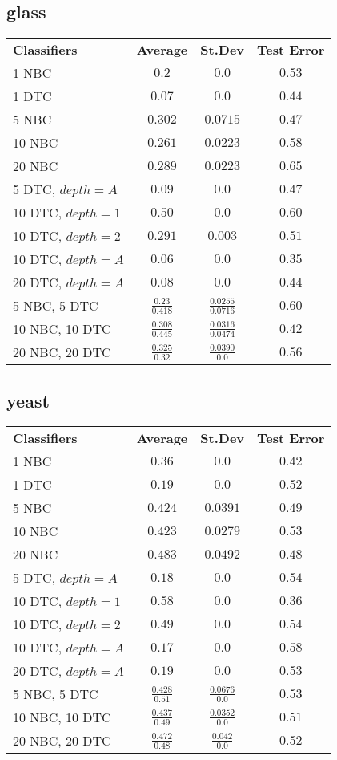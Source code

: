 \documentclass[12pt]{article}
\begin{document}
	\subsection{glass}
		\begin{tabular}{lccc}
		\textbf{Classifiers} & \textbf{Average} & \textbf{St.Dev} & \textbf{Test Error}\\
			1 NBC & $0.2$ & $0.0$ & $0.53$\\
			1 DTC & $0.07$ & $0.0$ & $0.44$\\
			5 NBC & $0.302$ & $0.0715$ & $0.47$\\
			10 NBC & $0.261$ & $0.0223$ & $0.58$\\
			20 NBC & $0.289$ & $0.0223$ & $0.65$\\
			5 DTC, $depth = A$ & $0.09$ & $0.0$ & $0.47$ \\
			10 DTC, $depth = 1$ & $0.50$ & $0.0$ & $0.60$ \\
			10 DTC, $depth = 2$ & $0.291$ & $0.003$ & $0.51$ \\
			10 DTC, $depth = A$ & $0.06$ & $0.0$ & $0.35$ \\
			20 DTC, $depth = A$ & $0.08$ & $0.0$ & $0.44$ \\
			5 NBC, 5 DTC & $\frac{0.23}{0.418}$ & $\frac{0.0255}{0.0716}$ & $0.60$ \\
			10 NBC, 10 DTC & $\frac{0.308}{0.445}$ & $\frac{0.0316}{0.0474}$ & $0.42$ \\
			20 NBC, 20 DTC & $\frac{0.325}{0.32}$ & $\frac{0.0390}{0.0}$ & $0.56$ \\
		\end{tabular}
		
	\subsection{yeast}
		\begin{tabular}{lccc}
		\textbf{Classifiers} & \textbf{Average} & \textbf{St.Dev} & \textbf{Test Error}\\
			1 NBC & $0.36$ & $0.0$ & $0.42$\\
			1 DTC & $0.19$ & $0.0$ & $0.52$\\
			5 NBC & $0.424$ & $0.0391$ & $0.49$\\
			10 NBC & $0.423$ & $0.0279$ & $0.53$\\
			20 NBC & $0.483$ & $0.0492$ & $0.48$\\
			5 DTC, $depth = A$ & $0.18$ & $0.0$ & $0.54$ \\
			10 DTC, $depth = 1$ & $0.58$ & $0.0$ & $0.36$ \\
			10 DTC, $depth = 2$ & $0.49$ & $0.0$ & $0.54$ \\
			10 DTC, $depth = A$ & $0.17$ & $0.0$ & $0.58$ \\
			20 DTC, $depth = A$ & $0.19$ & $0.0$ & $0.53$ \\
			5 NBC, 5 DTC & $\frac{0.428}{0.51}$ & $\frac{0.0676}{0.0}$ & $0.53$ \\
			10 NBC, 10 DTC & $\frac{0.437}{0.49}$ & $\frac{0.0352}{0.0}$ & $0.51$ \\
			20 NBC, 20 DTC & $\frac{0.472}{0.48}$ & $\frac{0.042}{0.0}$ & $0.52$ \\
		\end{tabular}
\end{document}
